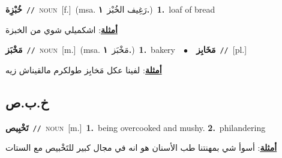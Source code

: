 \documentclass[10pt,a4paper,twoside]{article} %
\begin{document}
\begin{multicols}{2}
{{\setlength\topsep{0pt}\textbf{\foreignlanguage{arabic}{خُبْزِة}}\ {\color{gray}\texttt{//}\color{black}}\ \textsc{noun}\ [f.]\ \color{gray}(msa. \foreignlanguage{arabic}{رَغِيف الخُبْز}~\foreignlanguage{arabic}{\textbf{١.}})\color{black}\ \textbf{1.}~loaf of bread\  \begin{flushright}\color{gray}\foreignlanguage{arabic}{\textbf{\underline{\foreignlanguage{arabic}{أمثلة}}}: اشكميلي شوي من الخبزة}\end{flushright}\color{black}} \vspace{2mm}

{\setlength\topsep{0pt}\textbf{\foreignlanguage{arabic}{مَخْبَز}}\ {\color{gray}\texttt{//}\color{black}}\ \textsc{noun}\ [m.]\ \color{gray}(msa. \foreignlanguage{arabic}{مَخْبَز}~\foreignlanguage{arabic}{\textbf{١.}})\color{black}\ \textbf{1.}~bakery\ \ $\bullet$\ \ \setlength\topsep{0pt}\textbf{\foreignlanguage{arabic}{مَخَابِز}}\ {\color{gray}\texttt{//}\color{black}}\ [pl.]\  \begin{flushright}\color{gray}\foreignlanguage{arabic}{\textbf{\underline{\foreignlanguage{arabic}{أمثلة}}}: لفينا عكل مَخابِز طولكرم مالقيناش زيه}\end{flushright}\color{black}} \vspace{2mm}

\vspace{-3mm}
\subsection*{\color{blue}\foreignlanguage{arabic}{خ.ب.ص}\color{blue}{}} 

{\setlength\topsep{0pt}\textbf{\foreignlanguage{arabic}{تَخْبِيص}}\ {\color{gray}\texttt{//}\color{black}}\ \textsc{noun}\ [m.]\ \textbf{1.}~being overcooked and mushy.  \textbf{2.}~philandering\  \begin{flushright}\color{gray}\foreignlanguage{arabic}{\textbf{\underline{\foreignlanguage{arabic}{أمثلة}}}: أسوأ شي بمهنتنا طب الأسنان هو انه في مجال كبير للتَخْبيص مع الستات}\end{flushright}\color{black}} \vspace{2mm}

}
\end{multicols}
\end{document}
